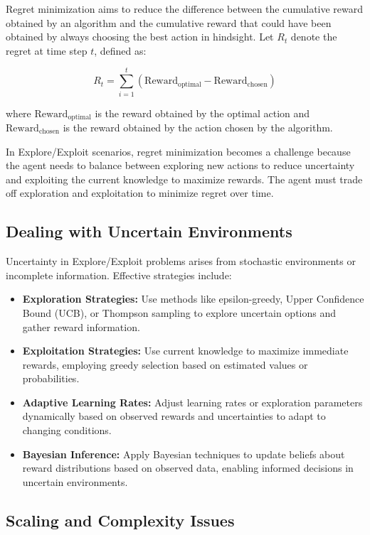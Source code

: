 \documentclass[12pt]{book} %
\begin{document}
Regret minimization aims to reduce the difference between the cumulative reward obtained by an algorithm and the cumulative reward that could have been obtained by always choosing the best action in hindsight. Let \(R_t\) denote the regret at time step \(t\), defined as:

\[
R_t = \sum_{i=1}^{t} (\text{Reward}_{\text{optimal}} - \text{Reward}_{\text{chosen}})
\]

where \(\text{Reward}_{\text{optimal}}\) is the reward obtained by the optimal action and \(\text{Reward}_{\text{chosen}}\) is the reward obtained by the action chosen by the algorithm.

In Explore/Exploit scenarios, regret minimization becomes a challenge because the agent needs to balance between exploring new actions to reduce uncertainty and exploiting the current knowledge to maximize rewards. The agent must trade off exploration and exploitation to minimize regret over time.

\subsection{Dealing with Uncertain Environments}

Uncertainty in Explore/Exploit problems arises from stochastic environments or incomplete information. Effective strategies include:

\begin{itemize}
    \item \textbf{Exploration Strategies:} Use methods like epsilon-greedy, Upper Confidence Bound (UCB), or Thompson sampling to explore uncertain options and gather reward information.
    \item \textbf{Exploitation Strategies:} Use current knowledge to maximize immediate rewards, employing greedy selection based on estimated values or probabilities.
    \item \textbf{Adaptive Learning Rates:} Adjust learning rates or exploration parameters dynamically based on observed rewards and uncertainties to adapt to changing conditions.
    \item \textbf{Bayesian Inference:} Apply Bayesian techniques to update beliefs about reward distributions based on observed data, enabling informed decisions in uncertain environments.
\end{itemize}

\subsection{Scaling and Complexity Issues}
\end{document}
